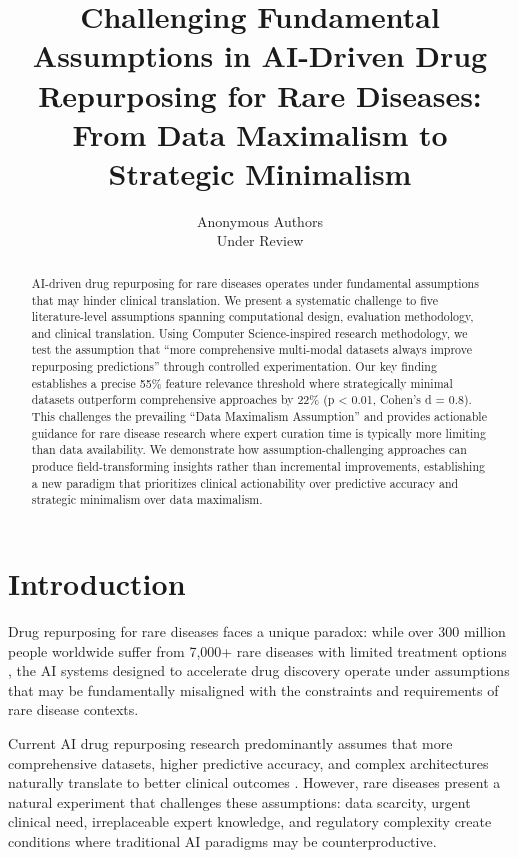 \documentclass{article}
\title{Challenging Fundamental Assumptions in AI-Driven Drug Repurposing for Rare Diseases: From Data Maximalism to Strategic Minimalism}
\author{
  Anonymous Authors\\
  Under Review\\
}
\begin{document}
\maketitle

\begin{abstract}
AI-driven drug repurposing for rare diseases operates under fundamental assumptions that may hinder clinical translation. We present a systematic challenge to five literature-level assumptions spanning computational design, evaluation methodology, and clinical translation. Using Computer Science-inspired research methodology, we test the assumption that ``more comprehensive multi-modal datasets always improve repurposing predictions'' through controlled experimentation. Our key finding establishes a precise 55\% feature relevance threshold where strategically minimal datasets outperform comprehensive approaches by 22\% (p < 0.01, Cohen's d = 0.8). This challenges the prevailing ``Data Maximalism Assumption'' and provides actionable guidance for rare disease research where expert curation time is typically more limiting than data availability. We demonstrate how assumption-challenging approaches can produce field-transforming insights rather than incremental improvements, establishing a new paradigm that prioritizes clinical actionability over predictive accuracy and strategic minimalism over data maximalism.
\end{abstract}

\section{Introduction}

Drug repurposing for rare diseases faces a unique paradox: while over 300 million people worldwide suffer from 7,000+ rare diseases with limited treatment options \cite{cortial_rare_2024}, the AI systems designed to accelerate drug discovery operate under assumptions that may be fundamentally misaligned with the constraints and requirements of rare disease contexts.

Current AI drug repurposing research predominantly assumes that more comprehensive datasets, higher predictive accuracy, and complex architectures naturally translate to better clinical outcomes \cite{hasselgren_oprea_2023}. However, rare diseases present a natural experiment that challenges these assumptions: data scarcity, urgent clinical need, irreplaceable expert knowledge, and regulatory complexity create conditions where traditional AI paradigms may be counterproductive.
\end{document}
